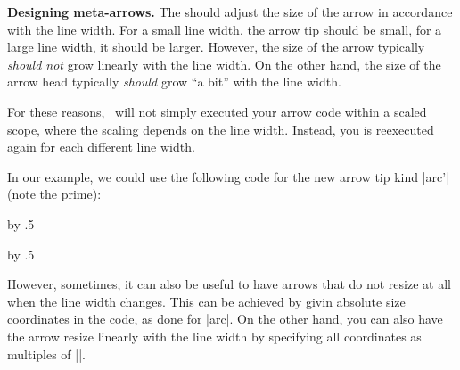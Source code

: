 \begin{command}{\pgfarrowsdeclare{}}
  \medskip
  \textbf{Designing meta-arrows.}
  The  should adjust the size of the arrow in
  accordance with the line width. For a small line width, the arrow
  tip should be small, for a large line width, it should be
  larger. However, the size of the arrow typically \emph{should not}
  grow linearly with the line width. On the other hand, the size of
  the arrow head typically \emph{should} grow ``a bit'' with the line
  width. 

  For these reasons, \pgfname\ will not simply executed your arrow
  code within a scaled scope, where the scaling depends on the line
  width. Instead, you  is reexecuted again for
  each different line width.

  In our example, we could use the following code for the new arrow
  tip kind |arc'| (note the prime):
\begin{codeexample}
\newdimen\arrowsize    
{}
{
  \arrowsize=0.2pt
  \advance\arrowsize by .5\pgflinewidth
  \pgfsetdash{}{0pt} %
  \pgfsetroundjoin   %
  \pgfsetroundcap    %
  \pgfpathmoveto{\pgfpoint{-4\arrowsize}{4\arrowsize}}
  \pgfusepathqstroke
}
\end{codeexample}
\newdimen\arrowsize    
{}
{
  \arrowsize=0.2pt
  \advance\arrowsize by .5\pgflinewidth
  \pgfsetdash{}{0pt} %
  \pgfsetroundjoin   %
  \pgfsetroundcap    %
  \pgfpathmoveto{\pgfpoint{-4\arrowsize}{4\arrowsize}}
  \pgfusepathqstroke
  \pgfpathmoveto{\pgfpointorigin}
  \pgfusepathqstroke
}
\begin{codeexample}[]
\end{codeexample}
  
  However, sometimes, it can also be useful to have arrows that do not
  resize at all when the line width changes. This can be achieved by
  givin absolute size coordinates in the code, as done for |arc|. On
  the other hand, you can also have the arrow resize linearly with the
  line width by specifying all coordinates as multiples of
  |\pgflinewidth|.


\end{command}

